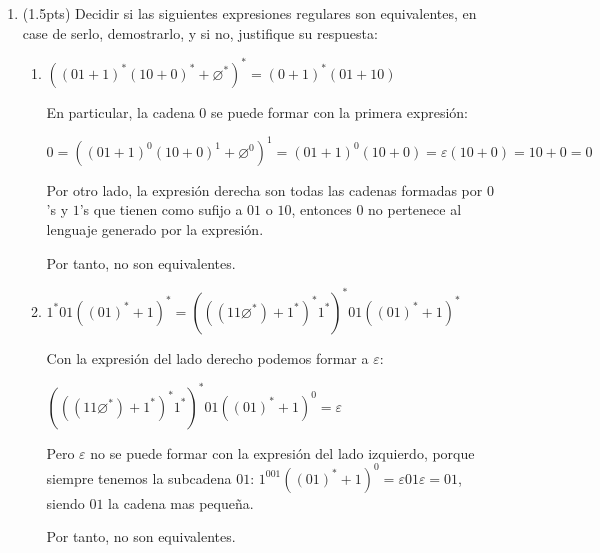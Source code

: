 \documentclass{article}
\begin{document}
\begin{enumerate}
    
    \item (1.5pts) Decidir si las siguientes expresiones regulares son equivalentes, en case de serlo, demostrarlo, y si no, justifique su respuesta:
    \begin{enumerate}[label=\alph*)]
        \item $((01 + 1)^*(10 + 0)^* + \varnothing^*)^* = (0 + 1)^*(01 + 10)$ 
        
        En particular, la cadena $0$ se puede formar con la primera expresión:

        $0 = ((01 + 1)^0(10 + 0)^1 + \varnothing ^ 0)^1 = (01 + 1)^0(10 + 0) = \varepsilon(10 + 0) = 10 + 0 = 0$ 

        Por otro lado, la expresión derecha son todas las cadenas formadas por $0$'s y $1$'s que tienen como sufijo a $01$ o $10$, entonces $0$ no pertenece al lenguaje generado por la expresión.
        
        Por tanto, no son equivalentes.
            \item $1^*01((01)^* + 1)^* = (((11\varnothing^*) + 1^*)^*1^*)^*01((01)^* + 1)^*$
            
            Con la expresión del lado derecho podemos formar a $\varepsilon$:

            $(((11\varnothing^*) + 1^*)^*1^*)^*01((01)^* + 1)^0 = \varepsilon$

            Pero $\varepsilon$ no se puede formar con la expresión del lado izquierdo, porque siempre tenemos la subcadena $01$: $1^001((01)^* + 1)^0 = \varepsilon 01 \varepsilon = 01$, siendo $01$ la cadena mas pequeña.
            
            Por tanto, no son equivalentes.
    \end{enumerate}
\end{enumerate}
\end{document}
